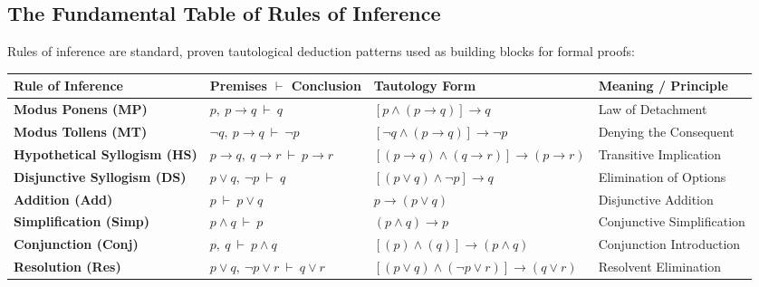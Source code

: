 \documentclass[11pt,a4paper]{article}
\begin{document}
\subsection{The Fundamental Table of Rules of Inference}
Rules of inference are standard, proven tautological deduction patterns used as building blocks for formal proofs:

\begin{theorembox}
\renewcommand{\arraystretch}{1.2}
\small
\setlength{\tabcolsep}{3.5pt}
\begin{tabularx}{\linewidth}{@{}l l l >{\raggedright\arraybackslash}X@{}}
\toprule
\textbf{Rule of Inference} & \textbf{Premises $\vdash$ Conclusion} & \textbf{Tautology Form} & \textbf{Meaning / Principle} \\
\midrule
\textbf{Modus Ponens (MP)} & $p, \ p \rightarrow q \ \vdash \ q$ & $[p \wedge (p \rightarrow q)] \rightarrow q$ & Law of Detachment \\
\textbf{Modus Tollens (MT)} & $\neg q, \ p \rightarrow q \ \vdash \ \neg p$ & $[\neg q \wedge (p \rightarrow q)] \rightarrow \neg p$ & Denying the Consequent \\
\textbf{Hypothetical Syllogism (HS)} & $p \rightarrow q, \ q \rightarrow r \ \vdash \ p \rightarrow r$ & $[(p \to q) \wedge (q \to r)] \rightarrow (p \to r)$ & Transitive Implication \\
\textbf{Disjunctive Syllogism (DS)} & $p \vee q, \ \neg p \ \vdash \ q$ & $[(p \vee q) \wedge \neg p] \rightarrow q$ & Elimination of Options \\
\textbf{Addition (Add)} & $p \ \vdash \ p \vee q$ & $p \rightarrow (p \vee q)$ & Disjunctive Addition \\
\textbf{Simplification (Simp)} & $p \wedge q \ \vdash \ p$ & $(p \wedge q) \rightarrow p$ & Conjunctive Simplification \\
\textbf{Conjunction (Conj)} & $p, \ q \ \vdash \ p \wedge q$ & $[(p) \wedge (q)] \rightarrow (p \wedge q)$ & Conjunction Introduction \\
\textbf{Resolution (Res)} & $p \vee q, \ \neg p \vee r \ \vdash \ q \vee r$ & $[(p \vee q) \wedge (\neg p \vee r)] \rightarrow (q \vee r)$ & Resolvent Elimination \\
\bottomrule
\end{tabularx}
\end{theorembox}
\end{document}
